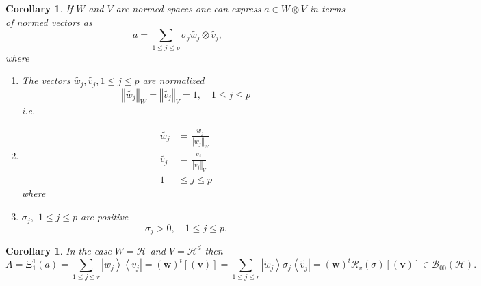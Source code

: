 \documentclass[aps,preprint]{revtex4}
\newtheorem{corollary}[theorem]{Corollary}
\begin{document}
\begin{corollary}
If $W$ and $V$ are normed spaces one can express $a\in W\otimes V$ in terms
of normed vectors as 
\begin{equation}
a=\sum_{1\leq j\leq p}\sigma_{j}\widetilde{w_{j}}\otimes\widetilde{v_{j}},
\end{equation}
where

\begin{enumerate}
\item The vectors $\widetilde{w_{j}},\widetilde{v_{j}},1\leq j\leq p$ are
normalized 
\begin{equation}
\left\Vert \widetilde{w_{j}}\right\Vert _{W}=\left\Vert \widetilde{v_{j}}%
\right\Vert _{V}=1,\quad 1\leq j\leq p
\end{equation}%
i.e.

\item 
\begin{align}
\widetilde{w_{j}}& =\frac{w_{j}}{\left\Vert w_{j}\right\Vert _{W}} \\
\widetilde{v_{j}}& =\frac{v_{j}}{\left\Vert v_{j}\right\Vert _{V}} \\
1& \leq j\leq p
\end{align}%
where

\item $\sigma _{j},$ $1\leq j\leq p$ are positive 
\begin{equation}
\sigma _{j}>0,\quad 1\leq j\leq p.
\end{equation}
\end{enumerate}
\end{corollary}

\begin{corollary}
In the case $W=\mathcal{H}$ and $V=\mathcal{H}^{d}$ then 
\begin{equation}
A=\Xi _{1}^{1}\left( a\right) =\sum_{1\leq j\leq r}\left\vert
w_{j}\right\rangle \left\langle v_{j}\right\vert =\left( \boldsymbol{w}%
\right) ^{t}\left[ \left( \boldsymbol{v}\right) \right] =\sum_{1\leq j\leq
r}\left\vert \widetilde{w_{j}}\right\rangle \sigma _{j}\left\langle 
\widetilde{v_{j}}\right\vert =\left( \boldsymbol{w}\right) ^{t}\mathcal{R}%
_{v}\left( \sigma \right) \left[ \left( \boldsymbol{v}\right) \right] \in 
\mathcal{B}_{00}\left( \mathcal{H}\right) .
\end{equation}
\end{corollary}
\end{document}

